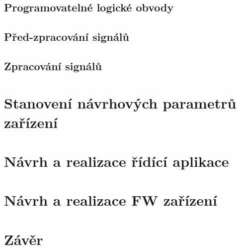 \documentclass[oneside,12pt,a4paper]{template/SPSTemplate} %
\begin{document}
	
	

	
	\section{Programovatelné logické obvody}

	\section{Před-zpracování signálů}	
	
	\section{Zpracování signálů}

	\chapter{Stanovení návrhových parametrů zařízení}

	\chapter{Návrh a realizace řídící aplikace}
	
	\chapter{Návrh a realizace FW zařízení}

	\chapter{Závěr}

	\appendix
	
	\printbibliography
	
	\listoffigures
	\listoftables
	
\end{document}
